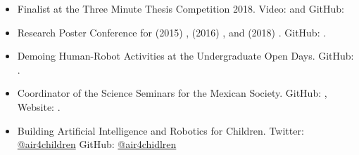 \documentclass{mycv}
\begin{document}
\begin{itemize}
\item  Finalist at the Three Minute Thesis Competition 2018. Video: \href{https://www.youtube.com/watch?v=07ewRYcS-0g}{\faYoutube} and 
GitHub: \href{https://github.com/mxochicale/3mt}{\faGithub*} 

\item Research Poster Conference for 
(2015) \href{https://github.com/mxochicale/PhD/blob/master/posters/Research_Poster_Conference_UoB/2015/poster/poster.pdf}{\faImage}, 
(2016) \href{https://github.com/mxochicale/PhD/blob/master/posters/Research_Poster_Conference_UoB/2016/poster/poster.pdf}{\faImage}, and  
(2018) \href{https://github.com/mxochicale/PhD/blob/master/posters/Research_Poster_Conference_UoB/2018/poster/main/map479-poster-uob2018.pdf}{\faImage}.
GitHub: \href{https://github.com/mxochicale/PhD/tree/master/posters/Research_Poster_Conference_UoB}{\faGithub*}.
\item Demoing Human-Robot Activities at the Undergraduate Open Days. GitHub: \href{https://github.com/mxochicale/opendayuob-hridemo}{\faGithub*}. 
\item Coordinator of the Science Seminars for the Mexican Society.  GitHub: \href{https://github.com/MexicanSocietyUoB}{\faGithub*}, Website: \href{https://mexicansocietyuob.github.io/seminars/}{\faExternalLink*}. 




\item Building Artificial Intelligence and Robotics for Children. 
Twitter: \href{https://twitter.com/air4children}{\faTwitter @air4children} 
GitHub: \href{https://github.com/air4children}{\faGithub* @air4chidlren} 



\end{itemize}
\end{document}
